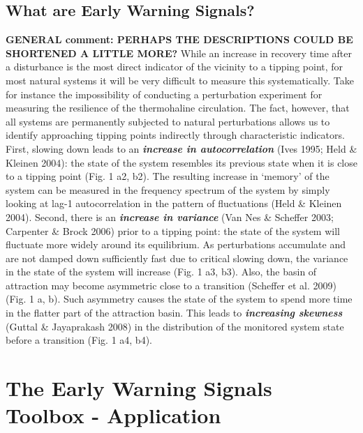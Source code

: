 \documentclass[12pt,a4paper,final]{article}
\begin{document}
\subsection{What are Early Warning Signals?}
{\bf GENERAL comment: PERHAPS THE DESCRIPTIONS COULD BE SHORTENED A LITTLE MORE?}
While an increase in recovery time after a disturbance is the most direct indicator of the vicinity to a tipping point, for most natural systems it will be very difficult to measure this systematically. Take for instance the impossibility of conducting a perturbation experiment for measuring the resilience of the thermohaline circulation. The fact, however, that all systems are permanently subjected to natural perturbations allows us to identify approaching tipping points indirectly through characteristic indicators. First, slowing down leads to an \textit{\textbf{increase in autocorrelation}} (Ives 1995; Held \& Kleinen 2004): the state of the system resembles its previous state when it is close to a tipping point (Fig. 1 a2, b2). The resulting increase in `memory' of the system can be measured in the frequency spectrum of the system by simply looking at lag-1 autocorrelation in the pattern of fluctuations (Held \& Kleinen 2004). Second, there is an \textit{\textbf{increase in variance}} (Van Nes \& Scheffer 2003; Carpenter \& Brock 2006) prior to a tipping point: the state of the system will fluctuate more widely around its equilibrium. As perturbations accumulate and are not damped down sufficiently fast due to critical slowing down, the variance in the state of the system will increase (Fig. 1 a3, b3). Also, the basin of attraction may become asymmetric close to a transition (Scheffer et al. 2009) (Fig. 1 a, b). Such asymmetry causes the state of the system to spend more time in the flatter part of the attraction basin. This leads to \textit{\textbf{increasing skewness}} (Guttal \& Jayaprakash 2008) in the distribution of the monitored system state before a transition (Fig. 1 a4, b4).

\section{The Early Warning Signals Toolbox - Application}
\end{document}
